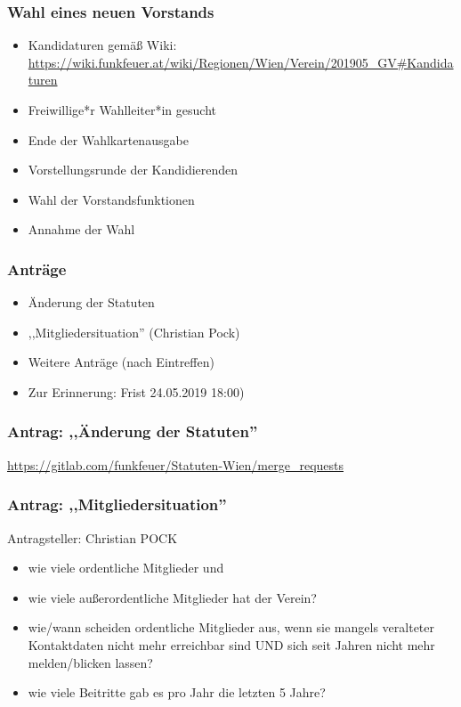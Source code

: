 \documentclass[17pt]{beamer}
\begin{document}
\begin{frame}
	\frametitle{Wahl eines neuen Vorstands}
	\begin{itemize}
		\item Kandidaturen gemäß Wiki: \url{https://wiki.funkfeuer.at/wiki/Regionen/Wien/Verein/201905_GV\#Kandidaturen}
		\item Freiwillige*r Wahlleiter*in gesucht
		\item Ende der Wahlkartenausgabe
		\item Vorstellungsrunde der Kandidierenden
		\item Wahl der Vorstandsfunktionen
		\item Annahme der Wahl
	\end{itemize}
\end{frame}



\begin{frame}
	\frametitle{Anträge}
	\begin{itemize}
		\item Änderung der Statuten
		\item ,,Mitgliedersituation'' (Christian Pock)
		\item Weitere Anträge (nach Eintreffen)
		\item Zur Erinnerung: Frist 24.05.2019 18:00)
	\end{itemize}
\end{frame}



\begin{frame}
	\frametitle{Antrag: ,,Änderung der Statuten''}
	\url{https://gitlab.com/funkfeuer/Statuten-Wien/merge_requests}
\end{frame}



\begin{frame}
	\frametitle{Antrag: ,,Mitgliedersituation''}
	Antragsteller: Christian POCK
	\small{
	\begin{itemize}
		\item wie viele ordentliche Mitglieder und
		\item wie viele außerordentliche Mitglieder hat der Verein?
		\item wie/wann scheiden ordentliche Mitglieder aus, wenn sie mangels veralteter Kontaktdaten nicht mehr erreichbar sind UND sich seit Jahren nicht mehr melden/blicken lassen?
		\item wie viele Beitritte gab es pro Jahr die letzten 5 Jahre?
	\end{itemize}
	}
\end{frame}
\end{document}

